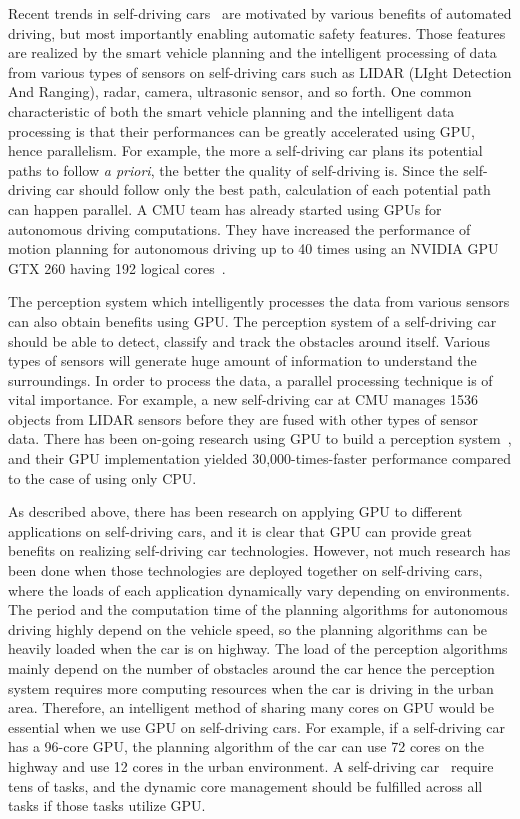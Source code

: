 \documentclass[times, 10pt, twocolumn]{article}
\begin{document}
Recent trends in self-driving cars~\cite{Urmson08, Markoff10, Kelly12} are motivated by various benefits of automated driving, but most importantly enabling automatic safety features. Those features are realized by the smart vehicle planning and the intelligent processing of data from various types of sensors on self-driving cars such as LIDAR (LIght Detection And Ranging), radar, camera, ultrasonic sensor, and so forth. One common characteristic of both the smart vehicle planning and the intelligent data processing is that their performances can be greatly accelerated using GPU, hence parallelism. For example, the more a self-driving car plans its potential paths to follow {\it a priori}, the better the quality of self-driving is. Since the self-driving car should follow only the best path, calculation of each potential path can happen parallel. A CMU team has already started using GPUs for autonomous driving computations. They have increased the performance of motion planning for autonomous driving up to 40 times using an NVIDIA GPU GTX 260 having 192 logical cores~\cite{McNaughton11}. 

The perception system which intelligently processes the data from various sensors can also obtain benefits using GPU. The perception system of a self-driving car should be able to detect, classify and track the obstacles around itself. Various types of sensors will generate huge amount of information to understand the surroundings. In order to process the data, a parallel processing technique is of vital importance. For example, a new self-driving car at CMU manages 1536 objects from LIDAR sensors before they are fused with other types of sensor data. There has been on-going research using GPU to build a perception system~\cite{Ferreira11}, and their GPU implementation yielded 30,000-times-faster performance compared to the case of using only CPU.

As described above, there has been research on applying GPU to different applications on self-driving cars, and it is clear that GPU can provide great benefits on realizing self-driving car technologies. However, not much research has been done when those technologies are deployed together on self-driving cars, where the loads of each application dynamically vary depending on environments. The period and the computation time of the planning algorithms for autonomous driving highly depend on the vehicle speed, so the planning algorithms can be heavily loaded when the car is on highway. The load of the perception algorithms mainly depend on the number of obstacles around the car hence the perception system requires more computing resources when the car is driving in the urban area. Therefore, an intelligent method of sharing many cores on GPU would be essential when we use GPU on self-driving cars. For example, if a self-driving car has a 96-core GPU, the planning algorithm of the car can use 72 cores on the highway and use 12 cores in the urban environment. A self-driving car~\cite{Urmson08} require tens of tasks, and the dynamic core management should be fulfilled across all tasks if those tasks utilize GPU. 
\end{document}
